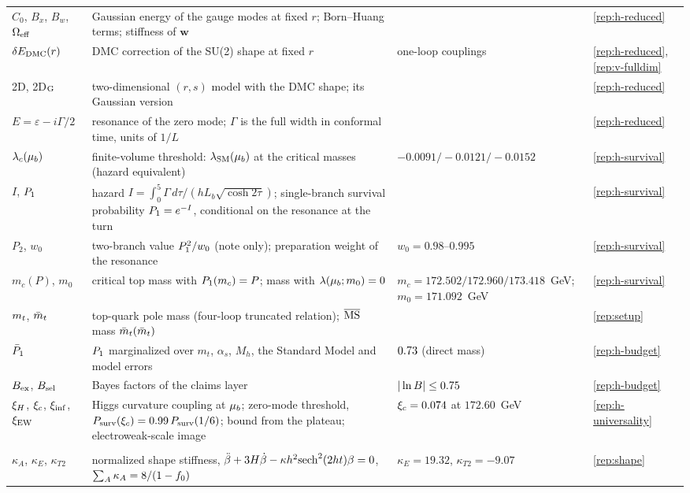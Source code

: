 {\begin{longtable}{@{}>{\raggedright\arraybackslash}p{}>{\raggedright\arraybackslash}p{}>{\raggedright\arraybackslash}p{}>{\raggedright\arraybackslash}p{}@{}}
$C_0$, $B_x$, $B_w$, $\Omega_{\rm eff}$ & Gaussian energy of the gauge modes at fixed $r$; Born--Huang terms; stiffness of $\bm w$ & & \ref{rep:h-reduced} \\
$\delta E_{\rm DMC}(r)$ & DMC correction of the SU(2) shape at fixed $r$ & one-loop couplings & \ref{rep:h-reduced}, \ref{rep:v-fulldim} \\
2D, 2D$_{\rm G}$ & two-dimensional $(r,s)$ model with the DMC shape; its Gaussian version & & \ref{rep:h-reduced} \\
$E=\varepsilon-i\Gamma/2$ & resonance of the zero mode; $\Gamma$ is the full width in conformal time, units of $1/L$ & & \ref{rep:h-reduced} \\
$\lambda_c(\mu_b)$ & finite-volume threshold: $\lambda_{\rm SM}(\mu_b)$ at the critical masses (hazard equivalent) & $-0.0091/\allowbreak{-}0.0121/\allowbreak{-}0.0152$ & \ref{rep:h-survival} \\ %
$I$, $P_1$ & hazard $I=\int_0^5\Gamma\,d\tau/(hL_b\sqrt{\cosh2\tau})$; single-branch survival probability $P_1=e^{-I}$, conditional on the resonance at the turn & & \ref{rep:h-survival} \\
$P_2$, $w_0$ & two-branch value $P_1^2/w_0$ (note only); preparation weight of the resonance & $w_0=0.98$--$0.995$ & \ref{rep:h-survival} \\
$m_c(P)$, $m_0$ & critical top mass with $P_1(m_c)=P$; mass with $\lambda(\mu_b;m_0)=0$ & $m_c=172.502/\allowbreak 172.960/\allowbreak 173.418$~GeV; $m_0=171.092$~GeV & \ref{rep:h-survival} \\ %
$m_t$, $\bar m_t$ & top-quark pole mass (four-loop truncated relation); $\overline{\mathrm{MS}}$ mass $\bar m_t(\bar m_t)$ & & \ref{rep:setup} \\
$\bar P_1$ & $P_1$ marginalized over $m_t$, $\alpha_s$, $M_h$, the Standard Model and model errors & $0.73$ (direct mass) & \ref{rep:h-budget} \\
$B_{\rm ex}$, $B_{\rm sel}$ & Bayes factors of the claims layer & $|\ln B|\le0.75$ & \ref{rep:h-budget} \\
$\xi_H$, $\xi_c$, $\xi_{\rm inf}$, $\xi_{\rm EW}$ & Higgs curvature coupling at $\mu_b$; zero-mode threshold, $P_{\rm surv}(\xi_c)=0.99\,P_{\rm surv}(1/6)$; bound from the plateau; electroweak-scale image & $\xi_c=0.074$ at $172.60$~GeV & \ref{rep:h-universality} \\
\addlinespace
\multicolumn{4}{@{}l}{\emph{Shape, emptiness gate and fossil}}\\*
$\kappa_A$, $\kappa_E$, $\kappa_{T2}$ & normalized shape stiffness, $\ddot\beta+3H\dot\beta-\kappa h^2{\rm sech}^2(2h t)\beta=0$, $\sum_A\kappa_A=8/(1-f_0)$ & $\kappa_E=19.32$, $\kappa_{T2}=-9.07$ & \ref{rep:shape} \\

\end{longtable}}
